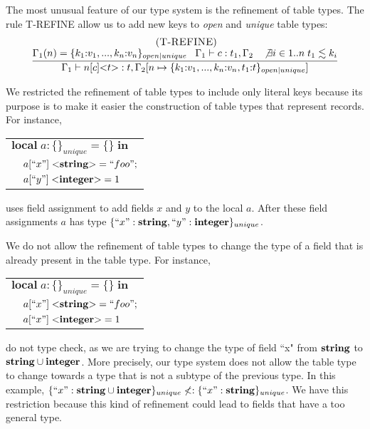 The most unusual feature of our type system is the refinement of
table types.
The rule \textsc{T-REFINE} allow us to add new keys to \emph{open}
and \emph{unique} table types:
\[
\begin{array}{c}
\; (\textsc{T-REFINE})\\
\dfrac{\Gamma_{1}(n) = \{ k_{1}{:}v_{1}, ..., k_{n}{:}v_{n} \}_{open|unique} \;\;\;
       \Gamma_{1} \vdash c:t_{1}, \Gamma_{2} \;\;\;
       \not \exists i \in 1..n \; t_{1} \lesssim k_{i}}
      {\Gamma_{1} \vdash n[c] {<}t{>}:t, \Gamma_{2}[n \mapsto \{ k_{1}{:}v_{1}, ..., k_{n}{:}v_{n}, t_{1}{:}t\}_{open|unique}]}
\end{array}
\]

We restricted the refinement of table types to include only literal
keys because its purpose is to make it easier the construction of
table types that represent records.
For instance, 
\begin{center}
\begin{tabular}{ll}
\multicolumn{2}{l}{$\mathbf{local} \; a:\{\}_{unique} = \{\} \; \mathbf{in}$}\\
& \multicolumn{1}{l}{$a[``x"] \; {<}\mathbf{string}{>} = ``foo";$}\\
& \multicolumn{1}{l}{$a[``y"] \; {<}\mathbf{integer}{>} = 1$}\\
\end{tabular}
\end{center}
uses field assignment to add fields $x$ and $y$ to the local $a$.
After these field assignments $a$ has type
$\{``x":\mathbf{string}, ``y":\mathbf{integer}\}_{unique}$.

We do not allow the refinement of table types to change the type of
a field that is already present in the table type.
For instance,
\begin{center}
\begin{tabular}{ll}
\multicolumn{2}{l}{$\mathbf{local} \; a:\{\}_{unique} = \{\} \; \mathbf{in}$}\\
& \multicolumn{1}{l}{$a[``x"] \; {<}\mathbf{string}{>} = ``foo";$}\\
& \multicolumn{1}{l}{$a[``x"] \; {<}\mathbf{integer}{>} = 1$}\\
\end{tabular}
\end{center}
do not type check, as we are trying to change the type of field
``x" from $\mathbf{string}$ to $\mathbf{string} \cup \mathbf{integer}$.
More precisely, our type system does not allow the table type to
change towards a type that is not a subtype of the previous type.
In this example,
$\{``x":\mathbf{string} \cup \mathbf{integer}\}_{unique} \not<: \{``x":\mathbf{string}\}_{unique}$.
We have this restriction because this kind of refinement could lead
to fields that have a too general type.

